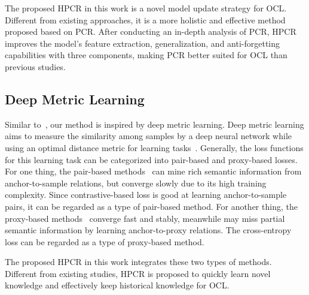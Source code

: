 The proposed HPCR in this work is a novel model update strategy for OCL. Different from existing approaches, it is a more holistic and effective method proposed based on PCR. After conducting an in-depth analysis of PCR, HPCR improves the model’s feature extraction, generalization, and anti-forgetting capabilities with three components, making PCR better suited for OCL than previous studies.


\subsection{Deep Metric Learning}
Similar to~\cite{yao2022pcl}, our method is inspired by deep metric learning. Deep metric learning aims to measure the similarity among samples by a deep neural network while using an optimal distance metric for learning tasks~\cite{yang2018person}. Generally, the loss functions for this learning task can be categorized into pair-based and proxy-based losses. For one thing, the pair-based methods~\cite{milbich2020sharing,elezi2022group} can mine rich semantic information from anchor-to-sample relations, but converge slowly due to its high training complexity. Since contrastive-based loss is good at learning anchor-to-sample pairs, it can be regarded as a type of pair-based method. For another thing, the proxy-based methods~\cite{zheng2023deep,roth2022non} converge fast and stably, meanwhile may miss partial semantic information by learning anchor-to-proxy relations. The cross-entropy loss can be regarded as a type of proxy-based method.

The proposed HPCR in this work integrates these two types of methods. Different from existing studies, HPCR is proposed to quickly learn novel knowledge and effectively keep historical knowledge for OCL.







